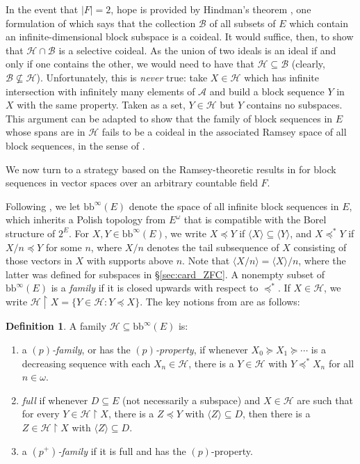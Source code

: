\documentclass[11pt]{amsart}
\newcommand{\restr}{\upharpoonright}
\newcommand{\LA}{\mathcal{A}}
\newcommand{\LB}{\mathcal{B}}
\theoremstyle{definition}
\newtheorem{defn}[thm]{Definition}
\theoremstyle{remark}
\newcommand{\LH}{\mathcal{H}}
\newcommand{\bb}{\mathrm{bb}}
\renewcommand{\1}{\mathbf{1}}
\begin{document}
In the event that $|F|=2$, hope is provided by Hindman's theorem \cite{MR0349574}, one formulation of which says that the collection $\LB$ of all subsets of $E$ which contain an infinite-dimensional block subspace is a coideal. It would suffice, then, to show that $\LH\cap\LB$ is a selective coideal. As the union of two ideals is an ideal if and only if one contains the other, we would need to have that $\LH\subseteq\LB$ (clearly, $\LB\not\subseteq\LH$). Unfortunately, this is \emph{never} true: take $X\in\LH$ which has infinite intersection with infinitely many elements of $\LA$ and build a block sequence $Y$ in $X$ with the same property. Taken as a set, $Y\in\LH$ but $Y$ contains no subspaces. This argument can be adapted to show that the family of block sequences in $E$ whose spans are in $\LH$ fails to be a coideal in the associated Ramsey space of all block sequences, in the sense of \cite{MR3748482}.

We now turn to a strategy based on the Ramsey-theoretic results in \cite{MR3864398} for block sequences in vector spaces over an arbitrary countable field $F$.%

Following \cite{MR3864398}, we let $\bb^\infty(E)$ denote the space of all infinite block sequences in $E$, which inherits a Polish topology from $E^\omega$ that is compatible with the Borel structure of $2^E$. For $X,Y\in\bb^\infty(E)$, we write $X\preceq Y$ if $\langle X\rangle\subseteq\langle Y\rangle$, and $X\preceq^*Y$ if $X/n\preceq Y$ for some $n$, where $X/n$ denotes the tail subsequence of $X$ consisting of those vectors in $X$ with supports above $n$. Note that $\langle X/n\rangle=\langle X\rangle/n$, where the latter was defined for subspaces in \S\ref{sec:card_ZFC}. A nonempty subset of $\bb^\infty(E)$ is a \emph{family} if it is  closed upwards with respect to $\preceq^*$. If $X\in\LH$, we write $\LH\restr X=\{Y\in\LH:Y\preceq X\}$. The key notions from \cite{MR3864398} are as follows:

\begin{defn}
	A family $\LH\subseteq\bb^\infty(E)$ is:
	\begin{enumerate}
		\item a \emph{$(p)$-family}, or has the \emph{$(p)$-property}, if whenever $X_0\succeq X_1\succeq \cdots$ is a decreasing sequence with each $X_n\in\LH$, there is a $Y\in\LH$ with $Y\preceq^* X_n$ for all $n\in\omega$.
		\item \emph{full} if whenever $D\subseteq E$ (not necessarily a subspace) and $X\in\LH$ are such that for every $Y\in\LH\restr X$, there is a $Z\preceq Y$ with $\langle Z\rangle\subseteq D$, then there is a $Z\in\LH\restr X$ with $\langle Z\rangle\subseteq D$.	
		\item a \emph{$(p^+)$-family} if it is full and has the $(p)$-property.
	\end{enumerate}
\end{defn}
\end{document}
